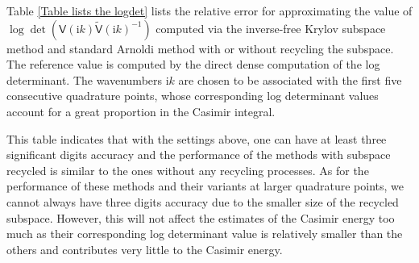 Table \ref{Table lists the logdet} lists the relative error for approximating the value of $\log\det(\mathsf{V}(\mathrm{i}k)\tilde{\mathsf{V}}(\mathrm{i}k)^{-1})$ 
computed via the inverse-free Krylov subspace method and standard Arnoldi method with or without recycling the subspace. The reference value is computed by the 
direct dense computation of the log determinant. The wavenumbers $\mathrm{i}k$ are chosen to be associated with the first five consecutive quadrature points, 
whose corresponding log determinant values account for a great proportion in the Casimir integral. 

This table indicates that with the settings above, one can have at least three significant digits accuracy and the performance of the methods with subspace 
recycled is similar to the ones without any recycling processes. As for the performance of these methods and their variants at larger quadrature points, we 
cannot always have three digits accuracy due to the smaller size of the recycled subspace. However, this will not affect the estimates of the Casimir energy too 
much as their corresponding log determinant value is relatively smaller than the others and contributes very little to the Casimir energy. 
 
